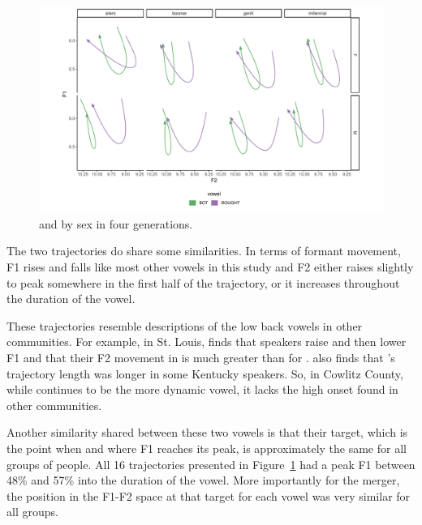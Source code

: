 \begin{figure}[tb!]
    \centering
    \includegraphics[width = 6.5in]{Figures/other_figures/low_back_trajs.pdf}
    \caption{\lot and \thought by sex in four generations.}
    \label{fig:bot_and_bought}
\end{figure}

The two trajectories do share some similarities. In terms of formant movement, F1 rises and falls like most other vowels in this study and F2 either raises slightly to peak somewhere in the first half of the trajectory, or it increases throughout the duration of the vowel.

These trajectories resemble descriptions of the low back vowels in other communities. For example, in St. Louis, \citet[176]{majors_2005} finds that speakers raise and then lower F1 and that their F2 movement in \thought is much greater than for \lot. \citet[159--161]{irons_2007} also finds that \thought's trajectory length was longer in some Kentucky speakers. So, in Cowlitz County, while \thought continues to be the more dynamic vowel, it lacks the high onset found in other communities.

Another similarity shared between these two vowels is that their target, which is the point when and where F1 reaches its peak, is approximately the same for all groups of people. All 16 trajectories presented in Figure~\ref{fig:bot_and_bought} had a peak F1 between 48\% and 57\% into the duration of the vowel. More importantly for the merger, the position in the F1-F2 space at that target for each vowel was very similar for all groups.

